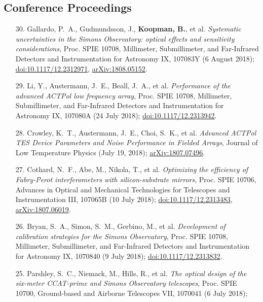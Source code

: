 \documentclass[margin,line]{res}
\begin{document}
\begin{resume}
\section{\sc Conference Proceedings} 
\begin{enumerate}

\item[{30.}] Gallardo, P.~A., Gudmundsson, J., \textbf{Koopman, B.}, et al.
    \textit{Systematic uncertainties in the Simons Observatory: optical effects
    and sensitivity considerations}, Proc. SPIE 10708, Millimeter, Submillimeter,
    and Far-Infrared Detectors and Instrumentation for Astronomy IX, 107083Y (6
    August 2018);
    \href{https://doi.org/10.1117/12.2312971}{doi:10.1117/12.2312971},
    \href{https://arxiv.org/abs/1808.05152}{arXiv:1808.05152}.
\item[{29.}] Li, Y., Austermann, J.~E., Beall, J.~A., et al.
    \textit{Performance of the advanced ACTPol low frequency array},
    Proc. SPIE 10708, Millimeter, Submillimeter, and Far-Infrared Detectors and
    Instrumentation for Astronomy IX, 107080A (24 July 2018);
    \href{https://doi.org/10.1117/12.2313942}{doi:10.1117/12.2313942}.
\item[{28.}] Crowley, K.~T., Austermann, J.~E., Choi, S.~K., et al.
    \textit{Advanced ACTPol TES Device Parameters and Noise Performance in Fielded Arrays},
    Journal of Low Temperature Physics (July 19, 2018);
    \href{https://arxiv.org/abs/1807.07496}{arXiv:1807.07496}.
\item[{27.}] Cothard, N.~F., Abe, M., Nikola, T., et al.
    \textit{Optimizing the efficiency of Fabry-Perot interferometers with silicon-substrate mirrors},
    Proc. SPIE 10706, Advances in Optical and Mechanical Technologies for
    Telescopes and Instrumentation III, 107065B (10 July 2018);
    \href{https://doi.org/10.1117/12.2313483}{doi:10.1117/12.2313483},
    \href{https://arxiv.org/abs/1807.06019}{arXiv:1807.06019}.
\item[{26.}] Bryan, S.~A., Simon, S.~M., Gerbino, M., et al.
    \textit{Development of calibration strategies for the Simons Observatory},
    Proc. SPIE 10708, Millimeter, Submillimeter, and Far-Infrared Detectors and
    Instrumentation for Astronomy IX, 1070840 (9 July 2018);
    \href{https://doi.org/10.1117/12.2313832}{doi:10.1117/12.2313832}.
\item[{25.}] Parshley, S.~C., Niemack, M., Hills, R., et al.
    \textit{The optical design of the six-meter CCAT-prime and Simons Observatory telescopes},
    Proc. SPIE 10700, Ground-based and Airborne Telescopes VII, 1070041 (6 July 2018);

\end{enumerate}
\end{resume}
\end{document}
